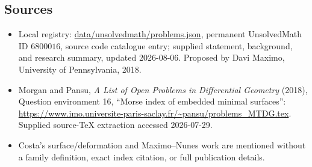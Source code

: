 \documentclass[11pt]{article}
\begin{document}
\subsection{Sources}
\begin{itemize}
\item Local registry: \url{data/unsolvedmath/problems.json}, permanent UnsolvedMath ID \(6800016\), source code catalogue entry; supplied statement, background, and research summary, updated 2026-08-06. Proposed by Davi Maximo, University of Pennsylvania, 2018.
\item Morgan and Pansu, \emph{A List of Open Problems in Differential Geometry} (2018), Question environment 16, ``Morse index of embedded minimal surfaces'': \url{https://www.imo.universite-paris-saclay.fr/~pansu/problems_MTDG.tex}. Supplied source-TeX extraction accessed 2026-07-29.
\item Costa's surface/deformation and Maximo--Nunes work are mentioned without a family definition, exact index citation, or full publication details.
\end{itemize}
\end{document}
